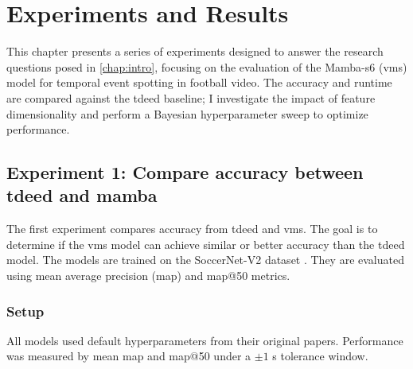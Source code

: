 \chapter{Experiments and Results}
\label{chap:experiments}
This chapter presents a series of experiments designed to answer the research questions posed in \autoref{chap:intro}, focusing on the evaluation of the Mamba-\acrshort{s6} (\acrshort{vms}) model for temporal event spotting in football video. The accuracy and runtime are compared against the \acrshort{tdeed} baseline; I investigate the impact of feature dimensionality and perform a Bayesian hyperparameter sweep to optimize performance.


\section{Experiment 1: Compare accuracy between \acrshort{tdeed} and mamba}
\label{sec:experiment1}
The first experiment compares accuracy from \acrfull{tdeed} and \acrfull{vms}. The goal is to determine if the \acrshort{vms} model can achieve similar or better accuracy than the \acrshort{tdeed} model. The models are trained on the SoccerNet-V2 dataset \cite{deliege_soccernet-v2_dataset_2021}. They are evaluated using mean average precision (\acrshort{map}) and \acrshort{map}@50 metrics.

\subsection{Setup}
\label{ssec:ex1_setup}

All models used default hyperparameters from their original papers. Performance was measured by mean \acrfull{map} and \acrshort{map}@50 under a \(\pm1\) s tolerance window.


